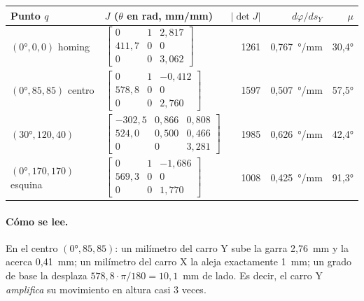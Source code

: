 \begin{center}\small
\begin{longtable}{>{\raggedright}p{3cm} >{\centering}p{6.3cm} r r r}
\toprule
\textbf{Punto $q$} & \textbf{$J$ ($\theta$ en rad, mm/mm)} & \textbf{$|\det J|$} & \textbf{$d\varphi/ds_Y$} & \textbf{$\mu$}\\
\midrule
\endhead
$(0°, 0, 0)$ homing & $\begin{bmatrix}0 & 1 & 2{,}817\\ 411{,}7 & 0 & 0\\ 0 & 0 & 3{,}062\end{bmatrix}$ & 1261 & 0,767~°/mm & 30,4°\\[14pt]
$(0°, 85, 85)$ centro & $\begin{bmatrix}0 & 1 & -0{,}412\\ 578{,}8 & 0 & 0\\ 0 & 0 & 2{,}760\end{bmatrix}$ & 1597 & 0,507~°/mm & 57,5°\\[14pt]
$(30°, 120, 40)$ & $\begin{bmatrix}-302{,}5 & 0{,}866 & 0{,}808\\ 524{,}0 & 0{,}500 & 0{,}466\\ 0 & 0 & 3{,}281\end{bmatrix}$ & 1985 & 0,626~°/mm & 42,4°\\[14pt]
$(0°, 170, 170)$ esquina & $\begin{bmatrix}0 & 1 & -1{,}686\\ 569{,}3 & 0 & 0\\ 0 & 0 & 1{,}770\end{bmatrix}$ & 1008 & 0,425~°/mm & 91,3°\\
\bottomrule
\end{longtable}
\end{center}

\paragraph{Cómo se lee.} En el centro $(0°, 85, 85)$: un milímetro del carro Y sube la garra 2,76~mm y la acerca 0,41~mm; un milímetro del carro X la aleja exactamente 1~mm; un grado de base la desplaza $578{,}8 \cdot \pi/180 = 10{,}1$~mm de lado. Es decir, el carro Y \emph{amplifica} su movimiento en altura casi 3 veces.


